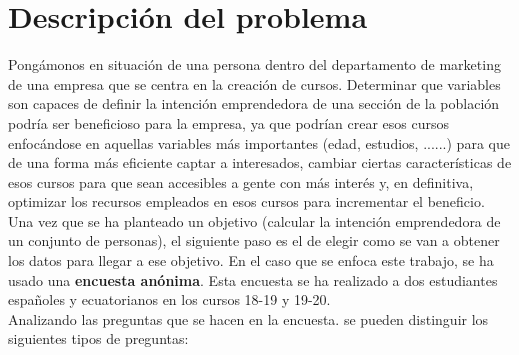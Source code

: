 \chapter{Descripción del problema}
\label{sec:problema}
Pongámonos en situación de una persona dentro del departamento de marketing de una empresa que se centra en la creación de cursos. Determinar que variables son capaces de definir la intención emprendedora de una sección de la población podría ser beneficioso para la empresa, ya que podrían crear esos cursos enfocándose en aquellas variables más importantes (edad, estudios, ......) para que de una forma más eficiente captar a interesados, cambiar ciertas características de esos cursos para que sean accesibles a gente con más interés y, en definitiva, optimizar los recursos empleados en esos cursos para incrementar el beneficio.\\
\linebreak
Una vez que se ha planteado un objetivo (calcular la intención emprendedora de un conjunto de personas), el siguiente paso es el de elegir como se van a obtener los datos para llegar a ese objetivo. En el caso que se enfoca este trabajo, se ha usado una \textbf{encuesta anónima}. Esta encuesta se ha realizado a dos estudiantes españoles y ecuatorianos en los cursos 18-19 y 19-20.\\
\linebreak
Analizando las preguntas que se hacen en la encuesta. se pueden distinguir los siguientes tipos de preguntas:
